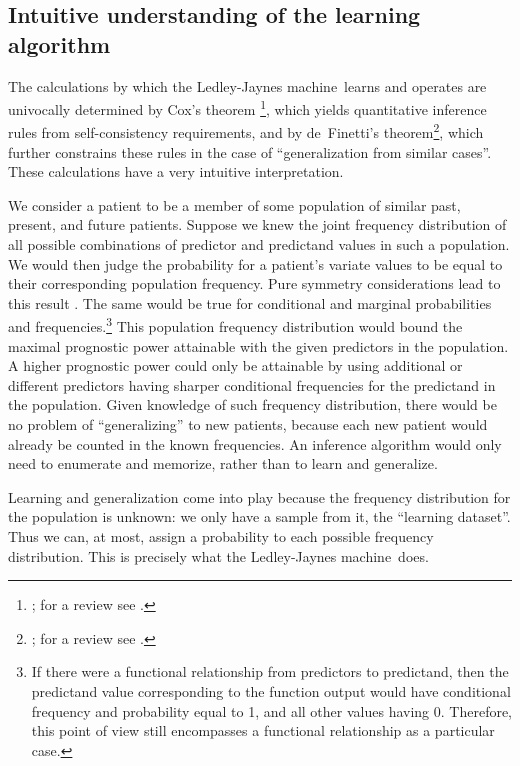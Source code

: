 \documentclass[utf8]{FrontiersinHarvard} %
\newcommand*{\sects}{\S\S}%
\renewcommand*{\|}[1][]{\nonscript\:#1\vert\nonscript\:\mathopen{}}
\newcommand*{\ljm}{Ledley-Jaynes machine}
\begin{document}
\subsection{Intuitive understanding of the learning algorithm}
\label{sec:the_machine_learning}

The calculations by which the \ljm\ learns and operates are univocally determined by Cox's theorem \footnote{\citealp{cox1946,cox1961,polya1954,polya1954b_r1968,tribus1969,fine1973,rosenkrantz1977,paris1994_r2006,snow1998,arnborgetal2001,snow2001,claytonetal2017}; for a review see \citealp{vanhorn2003}.}, which yields quantitative inference rules from self-consistency requirements, and by de~Finetti's theorem\footnote{\citealp[\sects~4.2--4.3]{definetti1930,definetti1937,bernardoetal1994_r2000}; for a review see \citealp{dawid2013}.}, which further constrains these rules in the case of \enquote{generalization from similar cases}. These calculations have a very intuitive interpretation.

We consider a patient to be a member of some population of similar past, present, and future patients. Suppose we knew the joint frequency distribution of all possible combinations of predictor and predictand values in such a population. We would then judge the probability for a patient's variate values to be equal to their corresponding population frequency. Pure symmetry considerations lead to this result \citep[\sects~4.2--4.3]{definetti1930,dawid2013,bernardoetal1994_r2000}. The same would be true for conditional and marginal probabilities and frequencies.\footnote{If there were a functional relationship from predictors to predictand, then the predictand value corresponding to the function output would have conditional frequency and probability equal to 1, and all other values having 0. Therefore, this point of view still encompasses a functional relationship as a particular case.} This population frequency distribution would bound the maximal prognostic power attainable with the given predictors in the population. A higher prognostic power could only be attainable by using additional or different predictors having sharper conditional frequencies for the predictand in the population. Given knowledge of such frequency distribution, there would be no problem of \enquote{generalizing} to new patients, because each new patient would already be counted in the known frequencies. An inference algorithm would only need to enumerate and memorize, rather than to learn and generalize.

Learning and generalization come into play because the frequency distribution for the population is unknown: we only have a sample from it, the \enquote{learning dataset}. Thus we can, at most, assign a probability to each possible frequency distribution. This is precisely what the \ljm\ does.
\end{document}
